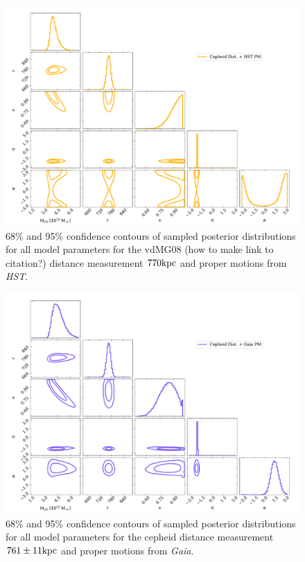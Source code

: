 \documentclass[twocolumn]{aastex631}
\begin{document}
\begin{figure}[htb]
  \centering
  \includegraphics[width=0.8\columnwidth]{analyze-runs-all-Dataset3.pdf}
  \caption{\label{fig:contour-dataset3}
    68\% and 95\% confidence contours of sampled posterior distributions for all
    model parameters for the vdMG08 (how to make link to citation?) distance
    measurement $770\rm kpc$ and proper motions from \textit{HST}.
  }
\end{figure}

\begin{figure}[htb]
  \centering
  \includegraphics[width=0.8\columnwidth]{analyze-runs-all-fiducial2021.pdf}
  \caption{\label{fig:contour-fiducial}
  68\% and 95\% confidence contours of sampled posterior distributions for all
  model parameters for the cepheid distance
  measurement $761\pm 11 \rm kpc$ and proper motions from \textit{Gaia}.
  }
\end{figure}

{}

\end{document}
